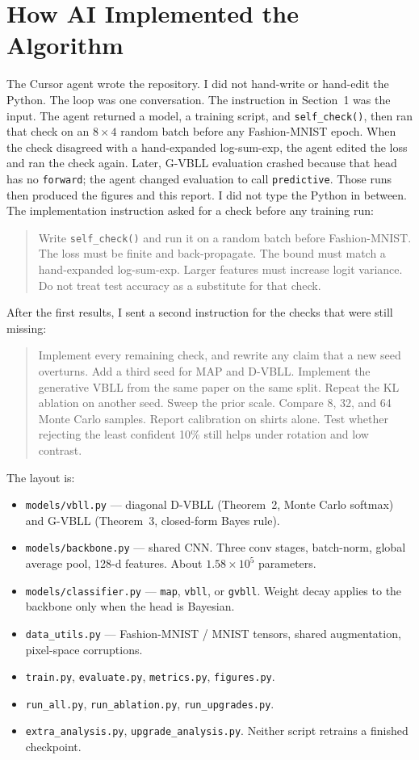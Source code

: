 \documentclass[11pt,a4paper]{article}
\begin{document}
\section{How AI Implemented the Algorithm}
The Cursor agent wrote the repository.
I did not hand-write or hand-edit the Python.
The loop was one conversation.
The instruction in Section~1 was the input.
The agent returned a model, a training script, and \texttt{self\_check()}, then ran that check on an $8\times 4$ random batch before any Fashion-MNIST epoch.
When the check disagreed with a hand-expanded log-sum-exp, the agent edited the loss and ran the check again.
Later, G-VBLL evaluation crashed because that head has no \texttt{forward}; the agent changed evaluation to call \texttt{predictive}.
Those runs then produced the figures and this report.
I did not type the Python in between.
The implementation instruction asked for a check before any training run:
\begin{quote}
\small
Write \texttt{self\_check()} and run it on a random batch before Fashion-MNIST. The loss must be finite and back-propagate. The bound must match a hand-expanded log-sum-exp. Larger features must increase logit variance. Do not treat test accuracy as a substitute for that check.
\end{quote}
After the first results, I sent a second instruction for the checks that were still missing:
\begin{quote}
\small
Implement every remaining check, and rewrite any claim that a new seed overturns. Add a third seed for MAP and D-VBLL. Implement the generative VBLL from the same paper on the same split. Repeat the KL ablation on another seed. Sweep the prior scale. Compare 8, 32, and 64 Monte Carlo samples. Report calibration on shirts alone. Test whether rejecting the least confident 10\% still helps under rotation and low contrast.
\end{quote}
The layout is:
\begin{itemize}
  \item \texttt{models/vbll.py} --- diagonal D-VBLL (Theorem~2, Monte Carlo softmax) and G-VBLL (Theorem~3, closed-form Bayes rule).
  \item \texttt{models/backbone.py} --- shared CNN. Three conv stages, batch-norm, global average pool, 128-d features. About $1.58\times 10^{5}$ parameters.
  \item \texttt{models/classifier.py} --- \texttt{map}, \texttt{vbll}, or \texttt{gvbll}. Weight decay applies to the backbone only when the head is Bayesian.
  \item \texttt{data\_utils.py} --- Fashion-MNIST / MNIST tensors, shared augmentation, pixel-space corruptions.
  \item \texttt{train.py}, \texttt{evaluate.py}, \texttt{metrics.py}, \texttt{figures.py}.
  \item \texttt{run\_all.py}, \texttt{run\_ablation.py}, \texttt{run\_upgrades.py}.
  \item \texttt{extra\_analysis.py}, \texttt{upgrade\_analysis.py}. Neither script retrains a finished checkpoint.
\end{itemize}
\end{document}
